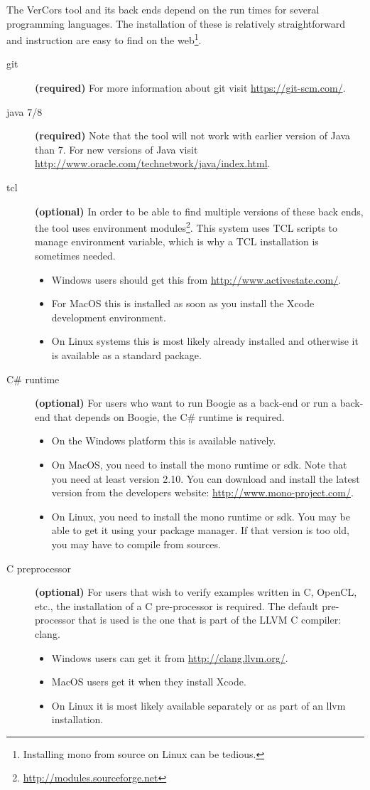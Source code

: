 The VerCors tool and its back ends depend on the run times for several programming languages.
The installation of these is relatively straightforward and instruction are easy to find
on the web\footnote{Installing mono from source on Linux can be tedious.}.
\begin{description}
\item[git] \textbf{(required)} For more information about git visit \url{https://git-scm.com/}.
\item[java 7/8] \textbf{(required)} Note that the tool will not work with earlier version of Java than 7.
For new versions of Java visit \url{http://www.oracle.com/technetwork/java/index.html}.
\item[tcl] \textbf{(optional)} In order to be able to find multiple versions of these back ends, the tool uses
environment modules\footnote{\url{http://modules.sourceforge.net}}. This system uses TCL scripts
to manage environment variable, which is why a TCL installation is sometimes needed.
\begin{itemize}[topsep=-1em]
\item Windows users should get this from \url{http://www.activestate.com/}.
\item For MacOS this is installed as soon as you install the Xcode development environment.
\item On Linux systems this is most likely already installed and otherwise it is available as a standard package.
\end{itemize}
\item[C\# runtime] \textbf{(optional)} For users who want to run Boogie as a back-end or run a back-end
that depends on Boogie, the C\# runtime is required.
\begin{itemize}[topsep=-1em]
\item On the Windows platform this is available natively.
\item On MacOS, you need to install
the mono runtime or sdk. Note that you need at least version 2.10. You can download and install the latest version from the developers website: \url{http://www.mono-project.com/}.
\item On Linux, you need to install
the mono runtime or sdk. You may be able to get it using
your package manager. If that version is too old, you may have to
compile from sources.
\end{itemize}
\item[C preprocessor] \textbf{(optional)} For users that wish to verify examples written
in C, OpenCL, etc., the installation of a C pre-processor is required.
The default pre-processor that is used is the one that is part of the
LLVM C compiler: clang.
\begin{itemize}
\item Windows users can get it from \url{http://clang.llvm.org/}. 
\item MacOS users get it when they install Xcode.
\item On Linux it is most likely available separately or as part of an
  llvm installation.
\end{itemize}
\end{description}

